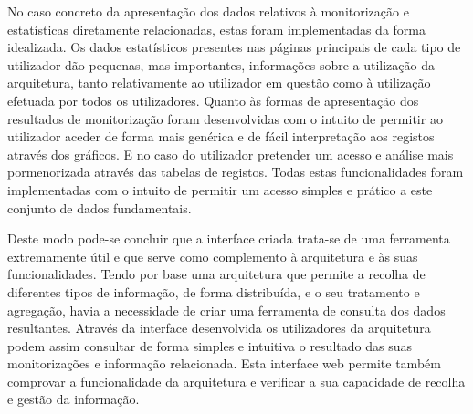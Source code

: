 No caso concreto da apresentação dos dados relativos à monitorização e estatísticas diretamente relacionadas, estas foram implementadas da forma idealizada. Os dados estatísticos presentes nas páginas principais de cada tipo de utilizador dão pequenas, mas importantes, informações sobre a utilização da arquitetura, tanto relativamente ao utilizador em questão como à utilização efetuada por todos os utilizadores. Quanto às formas de apresentação dos resultados de monitorização foram desenvolvidas com o intuito de permitir ao utilizador aceder de forma mais genérica e de fácil interpretação aos registos através dos gráficos. E no caso do utilizador pretender um acesso e análise mais pormenorizada através das tabelas de registos. Todas estas funcionalidades foram implementadas com o intuito de permitir um acesso simples e prático a este conjunto de dados fundamentais.

Deste modo pode-se concluir que a interface criada trata-se de uma ferramenta extremamente útil e que serve como complemento à arquitetura e às suas funcionalidades. Tendo por base uma arquitetura que permite a recolha de diferentes tipos de informação, de forma distribuída, e o seu tratamento e agregação, havia a necessidade de criar uma ferramenta de consulta dos dados resultantes. Através da interface desenvolvida os utilizadores da arquitetura podem assim consultar de forma simples e intuitiva o resultado das suas monitorizações e informação relacionada. Esta interface web permite também comprovar a funcionalidade da arquitetura e verificar a sua capacidade de recolha e gestão da informação.

